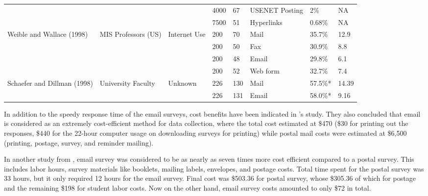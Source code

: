 \begin{center}
\begin{longtable}{ | p{2cm} | p{2cm} | p{2cm} | p{0.75cm} | p{0.75cm} | p{1cm} | p{1cm} | p{0.5cm} | }
	&  &  & 4000 & 67 & USENET Posting & 2\% & NA \\ \cline{4-8}
	&  &  & 7500 & 51 & Hyperlinks & 0.68\% & NA \\ \hline 
    \multirow{4}{2cm}{Weible and Wallace (1998)} & \multirow{4}{2cm}{MIS Professors (US)} & \multirow{4}{2cm}{Internet Use} & 200 & 70 & Mail & 35.7\% & 12.9 \\ \cline{4-8}
	&  &  & 200 & 50 & Fax & 30.9\% & 8.8 \\ \cline{4-8}
	&  &  & 200 & 48 & Email & 29.8\% & 6.1 \\ \cline{4-8}
	&  &  & 200 & 52 & Web form & 32.7\% & 7.4 \\ \hline
    \multirow{2}{2cm}{Schaefer and Dillman (1998)} & \multirow{2}{2cm}{University Faculty} & \multirow{2}{2cm}{Unknown} & 226 & 130 & Mail & 57.5\%* & 14.39 \\ \cline{4-8}
	&  &  & 226 & 131 & Email & 58.0\%* & 9.16 \\ \hline
    \end{longtable}
\end{center}


In addition to the speedy response time of the email surveys, cost benefits have been indicated in \citeauthor{Sheehan2006}'s \citeyearpar{Sheehan2006} study. They also concluded that email is considered as an extremely cost-efficient method for data collection, where the total cost estimated at \$470 (\$30 for printing out the responses, \$440 for the 22-hour computer usage on downloading surveys for printing) while postal mail costs were estimated at \$6,500 (printing, postage, survey, and reminder mailing).
\vspace{1cm}

In another study from \cite{Mavis1998}, email survey was considered to be as nearly as seven times more cost efficient compared to a postal survey. This includes labor hours, survey materials like booklets, mailing labels, envelopes, and postage costs. Total time spent for the postal survey was 33 hours, but it only required 12 hours for the email survey. Final cost was \$503.36 for postal survey, whose \$305.36 of which for postage and the remaining \$198 for student labor costs. Now on the other hand, email survey costs amounted to only \$72 in total.
\vspace{1cm}


